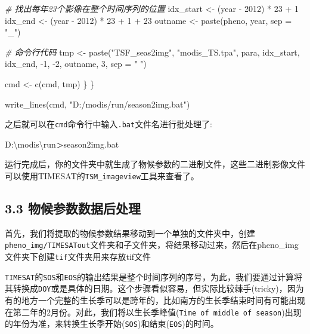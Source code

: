 \documentclass[
]{article}
\newenvironment{Shaded}{\begin{snugshade}}{\end{snugshade}}
\newcommand{\AttributeTok}[1]{\textcolor[rgb]{0.77,0.63,0.00}{#1}}
\newcommand{\CommentTok}[1]{\textcolor[rgb]{0.56,0.35,0.01}{\textit{#1}}}
\newcommand{\DecValTok}[1]{\textcolor[rgb]{0.00,0.00,0.81}{#1}}
\newcommand{\ExtensionTok}[1]{#1}
\newcommand{\FunctionTok}[1]{\textcolor[rgb]{0.00,0.00,0.00}{#1}}
\newcommand{\NormalTok}[1]{#1}
\newcommand{\OperatorTok}[1]{\textcolor[rgb]{0.81,0.36,0.00}{\textbf{#1}}}
\newcommand{\OtherTok}[1]{\textcolor[rgb]{0.56,0.35,0.01}{#1}}
\newcommand{\SpecialCharTok}[1]{\textcolor[rgb]{0.00,0.00,0.00}{#1}}
\newcommand{\StringTok}[1]{\textcolor[rgb]{0.31,0.60,0.02}{#1}}
\begin{document}
\begin{Shaded}
\begin{Highlighting}[]
    \CommentTok{\# 找出每年23个影像在整个时间序列的位置}
\NormalTok{    idx\_start }\OtherTok{\textless{}{-}}\NormalTok{ (year }\SpecialCharTok{{-}} \DecValTok{2012}\NormalTok{) }\SpecialCharTok{*} \DecValTok{23} \SpecialCharTok{+} \DecValTok{1}
\NormalTok{    idx\_end }\OtherTok{\textless{}{-}}\NormalTok{ (year }\SpecialCharTok{{-}} \DecValTok{2012}\NormalTok{) }\SpecialCharTok{*} \DecValTok{23} \SpecialCharTok{+} \DecValTok{1} \SpecialCharTok{+} \DecValTok{23}
\NormalTok{    outname }\OtherTok{\textless{}{-}} \FunctionTok{paste}\NormalTok{(pheno, year, }\AttributeTok{sep =} \StringTok{"\_"}\NormalTok{)}
    
    \CommentTok{\# 命令行代码}
\NormalTok{    tmp }\OtherTok{\textless{}{-}} \FunctionTok{paste}\NormalTok{(}\StringTok{"TSF\_seas2img"}\NormalTok{, }\StringTok{"modis\_TS.tpa"}\NormalTok{, para, idx\_start, idx\_end, }\SpecialCharTok{{-}}\DecValTok{1}\NormalTok{, }\SpecialCharTok{{-}}\DecValTok{2}\NormalTok{, outname, }\DecValTok{3}\NormalTok{, }\AttributeTok{sep =} \StringTok{" "}\NormalTok{)}
    
\NormalTok{    cmd }\OtherTok{\textless{}{-}} \FunctionTok{c}\NormalTok{(cmd, tmp)}
\NormalTok{  \}}
\NormalTok{\}}

\FunctionTok{write\_lines}\NormalTok{(cmd, }\StringTok{"D:/modis/run/season2img.bat"}\NormalTok{)}
\end{Highlighting}
\end{Shaded}

之后就可以在\texttt{cmd}命令行中输入\texttt{.bat}文件名进行批处理了:

\begin{Shaded}
\begin{Highlighting}[]
\ExtensionTok{D:\textbackslash{}modis\textbackslash{}run}\OperatorTok{\textgreater{}}\NormalTok{season2img.bat}
\end{Highlighting}
\end{Shaded}

运行完成后，你的文件夹中就生成了物候参数的二进制文件，这些二进制影像文件可以使用TIMESAT的\texttt{TSM\_imageview}工具来查看了。

\hypertarget{ux7269ux5019ux53c2ux6570ux6570ux636eux540eux5904ux7406}{%
\subsection{3.3
物候参数数据后处理}\label{ux7269ux5019ux53c2ux6570ux6570ux636eux540eux5904ux7406}}

首先，我们将提取的物候参数结果移动到一个单独的文件夹中，创建\texttt{pheno\_img/TIMESATout}文件夹和子文件夹，将结果移动过来，然后在pheno\_img文件夹下创建\texttt{tif}文件夹用来存放tif文件

\texttt{TIMESAT}的\texttt{SOS}和\texttt{EOS}的输出结果是整个时间序列的序号，为此，我们要通过计算将其转换成\texttt{DOY}或是具体的日期。这个步骤看似容易，但实际比较棘手(tricky)，因为有的地方一个完整的生长季可以是跨年的，比如南方的生长季结束时间有可能出现在第二年的2月份。对此，我们将以生长季峰值(\texttt{Time\ of\ middle\ of\ season})出现的年份为准，来转换生长季开始(\texttt{SOS})和结束(\texttt{EOS})的时间。
\end{document}
